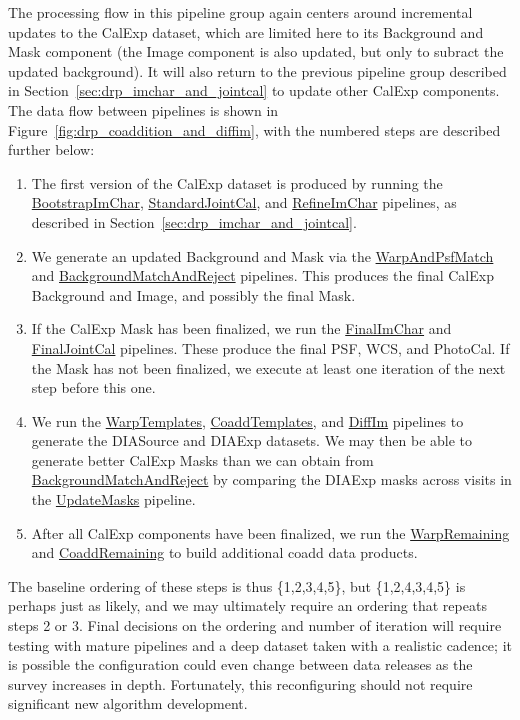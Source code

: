 The processing flow in this pipeline group again centers around incremental updates to the CalExp dataset, which are limited here to its Background and Mask component (the Image component is also updated, but only to subract the updated background).  It will also return to the previous pipeline group described in Section~\ref{sec:drp_imchar_and_jointcal} to update other CalExp components.  The data flow between pipelines is shown in Figure~\ref{fig:drp_coaddition_and_diffim}, with the numbered steps are described further below:
\begin{enumerate} %
\item The first version of the CalExp dataset is produced by running the \hyperref[sec:drpBootstrapImChar]{BootstrapImChar}, \hyperref[sec:drpStandardJointCal]{StandardJointCal}, and \hyperref[sec:drpRefineImChar]{RefineImChar} pipelines, as described in Section~\ref{sec:drp_imchar_and_jointcal}.
\item We generate an updated Background and Mask via the \hyperref[sec:drpWarpAndPsfMatch]{WarpAndPsfMatch} and \hyperref[sec:drpBackgroundMatchAndReject]{BackgroundMatchAndReject} pipelines.  This produces the final CalExp Background and Image, and possibly the final Mask.
\item If the CalExp Mask has been finalized, we run the \hyperref[sec:drpFinalImChar]{FinalImChar} and \hyperref[sec:drpFinalJointCal]{FinalJointCal} pipelines.  These produce the final PSF, WCS, and PhotoCal.  If the Mask has not been finalized, we execute at least one iteration of the next step before this one.
\item We run the \hyperref[sec:drpWarpTemplates]{WarpTemplates}, \hyperref[sec:drpCoaddTemplates]{CoaddTemplates}, and \hyperref[sec:drpDiffIm]{DiffIm} pipelines to generate the DIASource and DIAExp datasets.  We may then be able to generate better CalExp Masks than we can obtain from \hyperref[sec:drpBackgroundMatchAndReject]{BackgroundMatchAndReject} by comparing the DIAExp masks across visits in the \hyperref[sec:drpUpdateMasks]{UpdateMasks} pipeline.
\item After all CalExp components have been finalized, we run the \hyperref[sec:drpWarpRemaining]{WarpRemaining} and \hyperref[sec:drpCoaddRemaining]{CoaddRemaining} to build additional coadd data products.
\end{enumerate}
The baseline ordering of these steps is thus \{1,2,3,4,5\}, but \{1,2,4,3,4,5\} is perhaps just as likely, and we may ultimately require an ordering that repeats steps 2 or 3.  Final decisions on the ordering and number of iteration will require testing with mature pipelines and a deep dataset taken with a realistic cadence; it is possible the configuration could even change between data releases as the survey increases in depth.  Fortunately, this reconfiguring should not require significant new algorithm development.


